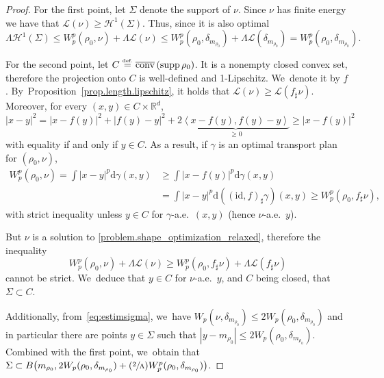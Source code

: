 \documentclass[10pt]{amsart}
\newcommand{\Psfrac}[2]{(\sfrac{#1}{#2})}
\theoremstyle{definition}
\newcommand{\eqdef}{\ensuremath{\stackrel{\mbox{\upshape\tiny def.}}{=}}}
\newcommand\cH{\mathcal{H}}
\newcommand\cL{\mathcal{L}}
\newcommand{\RR}{\mathbb{R}}
\DeclareMathOperator{\supp}{supp}
\DeclareMathOperator{\conv}{conv}
\newcommand{\cconv}{\overline{\conv}}
\newcommand\dd{\mathrm{d}}
\newcommand{\abs}[1]{\left\lvert#1\right\rvert}
\begin{document}
\begin{proof}
For the first point, let $\Sigma$ denote the support of $\nu$. Since $\nu$ has finite energy we have that $\mathcal{L}(\nu) \geq \cH^1(\Sigma)$. Thus, since it is also optimal
\begin{equation}\label{eq:estimsigma}
\Lambda \cH^1(\Sigma)
\leq
W^p_p(\rho_0,\nu)+\Lambda \mathcal{L}(\nu) \le
W^p_p(\rho_0,\delta_{m_{\rho_0}})+\Lambda \cL(\delta_{m_{\rho_0}}) = W^p_p(\rho_0,\delta_{m_{\rho_0}}).
\end{equation}

For the second point, let $C\eqdef \cconv\left(\supp \rho_0\right)$. It is a nonempty closed convex set, therefore the projection onto $C$ is well-defined and 1-Lipschitz. We~denote it by $f$. By~Proposition~\ref{prop.length.lipschitz}, it holds that $\cL(\nu)\geq \cL(f_\sharp \nu)$. Moreover, for every $(x,y)\in C\times \RR^d$,
\begin{equation*}
\abs{x-y}^2 =\abs{x-f(y)}^2 + \abs{f(y)-y}^2 +2\underbrace{\left\langle{x-f(y)},{f(y)-y}\right\rangle}_{\geq 0}\geq \abs{x-f(y)}^2
\end{equation*}
with equality if and only if $y \in C$. As a result, if $\gamma$ is an optimal transport plan for $(\rho_0,\nu)$,
\begin{align*}
W_p^p(\rho_0,\nu)= \int \abs{x-y}^p\dd \gamma(x,y) &\geq \int \abs{x-f(y)}^p\dd \gamma(x,y) \\
&=\int \abs{x-y}^p\dd\left((\text{id},f)_\sharp \gamma\right)(x,y) \geq W_p^p(\rho_0,f_\sharp\nu),
\end{align*}
with strict inequality unless $y \in C$ for $\gamma$-a.e.\ $(x,y)$ (hence $\nu$-a.e.\ $y$).

But $\nu$ is a solution to \eqref{problem.shape_optimization_relaxed}, therefore the inequality
\begin{equation*}
W_p^p(\rho_0,\nu)+ \Lambda \cL(\nu)\geq W_p^p(\rho_0,f_\sharp\nu)+ \Lambda \cL(f_\sharp \nu)
\end{equation*}
cannot be strict. We~deduce that $y \in C$ for $\nu$-a.e.\ $y$, and $C$ being closed, that $\Sigma \subset C$.

Additionally, from~\eqref{eq:estimsigma}, we~have
$W_p(\nu,\delta_{m_{\rho_0}})\le 2 W_p(\rho_0,\delta_{m_{\rho_0}})$ and
in particular there are points $y\in \Sigma$ such that
$|y-m_{\rho_0}|\le 2 W_p(\rho_0,\delta_{m_{\rho_0}})$. Combined
with the first point, we~obtain that $\Sigma\subset
B\big({m_{\rho_0}},2W_p(\rho_0,\delta_{m_{\rho_0}})
+ \Psfrac{2}{\Lambda}W_p^p(\rho_0,\delta_{m_{\rho_0}})\big)$.
\end{proof}
\end{document}
